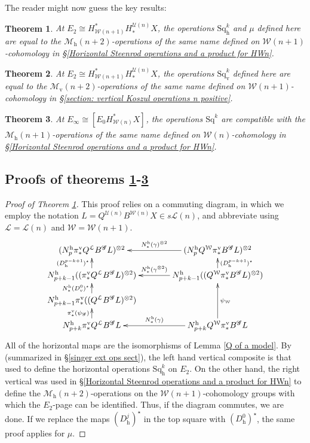 \documentclass[11pt]{amsart} \renewcommand{\baselinestretch}{1.2}
\theoremstyle{plain}
\newtheorem{thm}{Theorem}[section] %
\numberwithin{equation}{section} %
\theoremstyle{plain}
\newtheorem{thm}{Theorem}[chapter] %
\numberwithin{equation}{chapter} %
\newcommand{\scrG}{\mathscr{G}}
\newcommand{\calU}{\mathcal{U}}
\newcommand{\calL}{\mathcal{L}}
\newcommand{\calw}{\mathcal{W}}
\newcommand{\calMv}{\mathcal{M}\dver}
\newcommand{\calMh}{\mathcal{M}\dhor}
\newcommand{\BSW}{{\scrG}}
\newcommand{\BSWres}{B^\BSW}%
\newcommand{\Sq}{\mathrm{Sq}}
\newcommand{\Edown}[4]{[E_{#1}#2]^{#3}_{#4}}
\newcommand{\uver}{^\mathrm{v}}
\newcommand{\uhor}{^\mathrm{h}}
\newcommand{\dver}{_\mathrm{v}}
\newcommand{\dhor}{_\mathrm{h}}
\newcommand{\Sqh}{\mathrm{Sq}\dhor}
\newcommand{\Sqv}{\mathrm{Sq}\dver}
\newcommand{\SubsectionOrSection}[1]{\subsection{#1}}
\begin{document}
\begin{Operations in composite functor spectral sequences}
The reader might now guess the key results:
\begin{thm}
\label{E2CompFuncLieOperationsID}
At $E_2\cong H^*_{\calw(n+1)}H_*^{\calU(n)}X$, the operations $\Sqh^k$ and $\mu$ defined here are equal to the $\calMh(n+2)$-operations of the same name defined on $\calw(n+1)$-cohomology in
\S\ref{Horizontal Steenrod operations and a product for HWn}.
\end{thm}
\begin{thm}
\label{E2CompFuncKosOperationsID}
At $E_2\cong H^*_{\calw(n+1)}H_*^{\calU(n)}X$, the operations $\Sqv^k$ defined here are equal to the $\calMv(n+2)$-operations of the same name defined on $\calw(n+1)$-cohomology in
\S\ref{section: vertical Koszul operations n positive}.
\end{thm}
\begin{thm}
\label{EInftyCompFuncOperationsID}
At $E_\infty \cong \Edown{0}{H^*_{\calw(n)}X}{}{}$, the operations $\Sq^k$ are compatible with the
$\calMh(n+1)$-operations of the same name defined on $\calw(n)$-cohomology in
\S\ref{Horizontal Steenrod operations and a product for HWn}.
%
\end{thm} 
\SubsectionOrSection{Proofs of theorems \ref{E2CompFuncLieOperationsID}-\ref{EInftyCompFuncOperationsID}}

\begin{proof}[Proof of Theorem \ref{E2CompFuncLieOperationsID}]
This proof relies on a commuting diagram, in which we employ the  notation $L=Q^{\calU(n)} B^{\calw(n)}X \in s\calL(n)$, and abbreviate using $\calL=\calL(n)$ and $\calw=\calw(n+1)$.
\[\xymatrix@C=13mm@R=4mm{
(N\uhor_p\pi\uver_*Q^{\calL}\BSWres L)^{\otimes2}&%
(N\uhor_pQ^{\calw}\pi\uver_*\BSWres L)^{\otimes2}
\ar[l]_-{N\uhor_*(\gamma)^{\otimes 2}}
\\%
N\uhor_{p+k-1}((\pi\uver_*Q^{\calL}\BSWres L)^{\otimes2})
\ar[u]^-{(D\dhor^{p-k+1})^\star}
&%
N\uhor_{p+k-1}((Q^{\calw}\pi\uver_*\BSWres L)^{\otimes2})
\ar[u]_-{(D\dhor^{p-k+1})^\star}
\ar[l]_-{N\uhor_*(\gamma^{\otimes 2})}
\\%
N\uhor_{p+k-1}\pi\uver_*((Q^{\calL}\BSWres L)^{\otimes2})
\ar[u]^-{N\uhor_*(D\dver^0)^\star}
&%
\\%
N\uhor_{p+k}\pi\uver_* Q^{\calL}\BSWres L
\ar[u]^-{\pi\uver_*(\psi_\BSW)}
&%
N\uhor_{p+k}Q^{\calw}\pi\uver_* \BSWres L
\ar[uu]_-{\psi_{\calw}}
\ar[l]_-{N\uhor_*(\gamma)}
}\]
All of the horizontal maps are the isomorphisms of Lemma \ref{Q of a model}. By \cite[Theorem 2.23]{MR2245560} (summarized in \S\ref{singer ext ops sect}),  the left hand vertical composite is that used to define the horizontal operations $\Sqh^{k}$ on $E_2$. On the other hand, the right vertical was used in \S\ref{Horizontal Steenrod operations and a product for HWn} to define the $\calMh(n+2)$-operations on the $\calw(n+1)$-cohomology groups with which the $E_2$-page can be identified. Thus, if the diagram commutes, we are done. If we replace the maps $(D\dhor^j)^\star$ in the top square with $(D\dhor^0)^\star$, the same proof applies for $\mu$.


\end{proof}
\end{Operations in composite functor spectral sequences}
\end{document}

